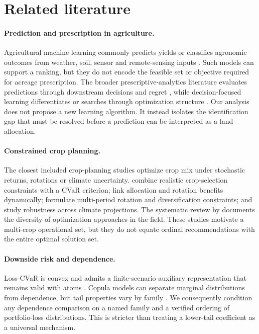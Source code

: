 \section{Related literature}

\paragraph{Prediction and prescription in agriculture.}
Agricultural machine learning commonly predicts yields or classifies agronomic outcomes from weather, soil, sensor and remote-sensing inputs \citep{liakos2018machine,vanklompenburg2020crop}. Such models can support a ranking, but they do not encode the feasible set or objective required for acreage prescription. The broader prescriptive-analytics literature evaluates predictions through downstream decisions and regret \citep{bertsimas2020predictive,elmachtoub2022smart}, while decision-focused learning differentiates or searches through optimization structure \citep{wilder2019melding,mandi2023decision}. Our analysis does not propose a new learning algorithm. It instead isolates the identification gap that must be resolved before a prediction can be interpreted as a land allocation.

\paragraph{Constrained crop planning.}
The closest included crop-planning studies optimize crop mix under stochastic returns, rotations or climate uncertainty. \citet{filippi2017mixed} combine realistic crop-selection constraints with a CVaR criterion; \citet{boyabatli2019crop} link allocation and rotation benefits dynamically; \citet{benini2023crop} formulate multi-period rotation and diversification constraints; and \citet{randall2022robust} study robustness across climate projections. The systematic review by \citet{randall2024systematic} documents the diversity of optimization approaches in the field. These studies motivate a multi-crop operational set, but they do not equate ordinal recommendations with the entire optimal solution set.

\paragraph{Downside risk and dependence.}
Loss-CVaR is convex and admits a finite-scenario auxiliary representation that remains valid with atoms \citep{rockafellar2000optimization,rockafellar2002conditional}. Copula models can separate marginal distributions from dependence, but tail properties vary by family \citep{demarta2005tcopula,ansari2024dependence}. We consequently condition any dependence comparison on a named family and a verified ordering of portfolio-loss distributions. This is stricter than treating a lower-tail coefficient as a universal mechanism.


